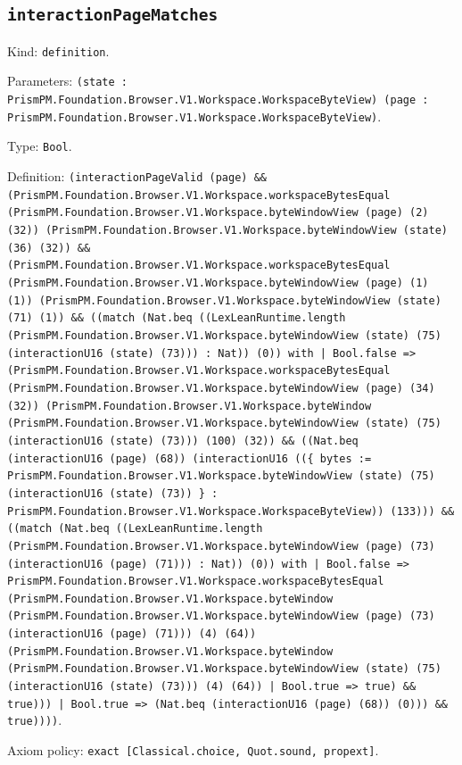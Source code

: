 \documentclass[11pt]{article}
\begin{document}
\subsection*{\texttt{interactionPageMatches}}
\noindent Kind: \texttt{definition}.\par
\noindent Parameters: \texttt{(state : PrismPM.Foundation.Browser.V1.Workspace.WorkspaceByteView) (page : PrismPM.Foundation.Browser.V1.Workspace.WorkspaceByteView)}.\par
\noindent Type: \texttt{Bool}.\par
\noindent Definition: \texttt{(interactionPageValid (page) \&\& (PrismPM.Foundation.Browser.V1.Workspace.workspaceBytesEqual (PrismPM.Foundation.Browser.V1.Workspace.byteWindowView (page) (2) (32)) (PrismPM.Foundation.Browser.V1.Workspace.byteWindowView (state) (36) (32)) \&\& (PrismPM.Foundation.Browser.V1.Workspace.workspaceBytesEqual (PrismPM.Foundation.Browser.V1.Workspace.byteWindowView (page) (1) (1)) (PrismPM.Foundation.Browser.V1.Workspace.byteWindowView (state) (71) (1)) \&\& ((match (Nat.beq ((LexLeanRuntime.length (PrismPM.Foundation.Browser.V1.Workspace.byteWindowView (state) (75) (interactionU16 (state) (73))) : Nat)) (0)) with | Bool.false => (PrismPM.Foundation.Browser.V1.Workspace.workspaceBytesEqual (PrismPM.Foundation.Browser.V1.Workspace.byteWindowView (page) (34) (32)) (PrismPM.Foundation.Browser.V1.Workspace.byteWindow (PrismPM.Foundation.Browser.V1.Workspace.byteWindowView (state) (75) (interactionU16 (state) (73))) (100) (32)) \&\& ((Nat.beq (interactionU16 (page) (68)) (interactionU16 ((\{ bytes := PrismPM.Foundation.Browser.V1.Workspace.byteWindowView (state) (75) (interactionU16 (state) (73)) \} : PrismPM.Foundation.Browser.V1.Workspace.WorkspaceByteView)) (133))) \&\& ((match (Nat.beq ((LexLeanRuntime.length (PrismPM.Foundation.Browser.V1.Workspace.byteWindowView (page) (73) (interactionU16 (page) (71))) : Nat)) (0)) with | Bool.false => PrismPM.Foundation.Browser.V1.Workspace.workspaceBytesEqual (PrismPM.Foundation.Browser.V1.Workspace.byteWindow (PrismPM.Foundation.Browser.V1.Workspace.byteWindowView (page) (73) (interactionU16 (page) (71))) (4) (64)) (PrismPM.Foundation.Browser.V1.Workspace.byteWindow (PrismPM.Foundation.Browser.V1.Workspace.byteWindowView (state) (75) (interactionU16 (state) (73))) (4) (64)) | Bool.true => true) \&\& true))) | Bool.true => (Nat.beq (interactionU16 (page) (68)) (0))) \&\& true))))}.\par
\noindent Axiom policy: \texttt{exact [Classical.choice, Quot.sound, propext]}.\par
\end{document}
